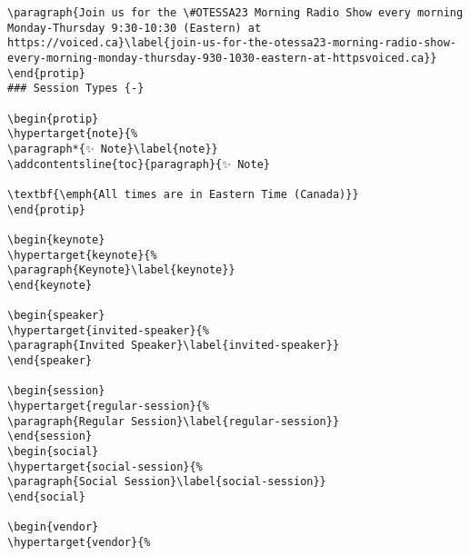\documentclass[
]{book}
\begin{document}
\begin{verbatim}
\paragraph{Join us for the \#OTESSA23 Morning Radio Show every morning
Monday-Thursday 9:30-10:30 (Eastern) at
https://voiced.ca}\label{join-us-for-the-otessa23-morning-radio-show-every-morning-monday-thursday-930-1030-eastern-at-httpsvoiced.ca}}
\end{protip}
### Session Types {-}

\begin{protip}
\hypertarget{note}{%
\paragraph*{✨ Note}\label{note}}
\addcontentsline{toc}{paragraph}{✨ Note}

\textbf{\emph{All times are in Eastern Time (Canada)}}
\end{protip}

\begin{keynote}
\hypertarget{keynote}{%
\paragraph{Keynote}\label{keynote}}
\end{keynote}

\begin{speaker}
\hypertarget{invited-speaker}{%
\paragraph{Invited Speaker}\label{invited-speaker}}
\end{speaker}

\begin{session}
\hypertarget{regular-session}{%
\paragraph{Regular Session}\label{regular-session}}
\end{session}
\begin{social}
\hypertarget{social-session}{%
\paragraph{Social Session}\label{social-session}}
\end{social}

\begin{vendor}
\hypertarget{vendor}{%

\end{verbatim}
\end{document}
